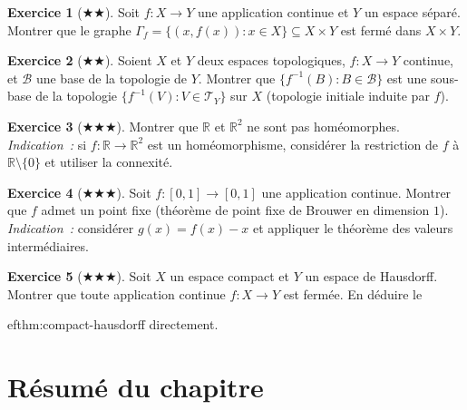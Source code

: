 \documentclass[12pt,a4paper,openany]{book}
\theoremstyle{definition}
\theoremstyle{cours}
\theoremstyle{coursnormal}
\newtheorem{exercice}{Exercice}[chapter]
\newcommand{\R}{\mathbb{R}}
\newcommand{\T}{\mathcal{T}}
\newcommand{\B}{\mathcal{B}}
\begin{document}
\begin{exercice}[$\bigstar\bigstar$]\label{exo:graphe-ferme}
  Soit $f\colon X\to Y$ une application continue et $Y$ un espace séparé.
  Montrer que le graphe $\Gamma_f = \{(x,f(x)) : x\in X\}\subseteq X\times Y$
  est fermé dans $X\times Y$.
\end{exercice}

\begin{exercice}[$\bigstar\bigstar$]
  Soient $X$ et $Y$ deux espaces topologiques, $f\colon X\to Y$ continue, et
  $\B$ une base de la topologie de $Y$. Montrer que
  $\{f^{-1}(B) : B\in\B\}$ est une sous-base de la topologie
  $\{f^{-1}(V) : V\in\T_Y\}$ sur $X$ (topologie initiale induite par $f$).
\end{exercice}

\begin{exercice}[$\bigstar\bigstar\bigstar$]
  Montrer que $\R$ et $\R^2$ ne sont pas homéomorphes.
  \emph{Indication~:} si $f\colon\R\to\R^2$ est un homéomorphisme, considérer
  la restriction de $f$ à $\R\setminus\{0\}$ et utiliser la connexité.
\end{exercice}

\begin{exercice}[$\bigstar\bigstar\bigstar$]
  Soit $f\colon[0,1]\to[0,1]$ une application continue. Montrer que $f$ admet
  un point fixe (théorème de point fixe de Brouwer en dimension $1$).
  \emph{Indication~:} considérer $g(x)=f(x)-x$ et appliquer le théorème des
  valeurs intermédiaires.
\end{exercice}

\begin{exercice}[$\bigstar\bigstar\bigstar$]
  Soit $X$ un espace compact et $Y$ un espace de Hausdorff. Montrer que toute
  application continue $f\colon X\to Y$ est fermée. En déduire le
  
ef{thm:compact-hausdorff} directement.
\end{exercice}

\section*{Résumé du chapitre}
\end{document}
